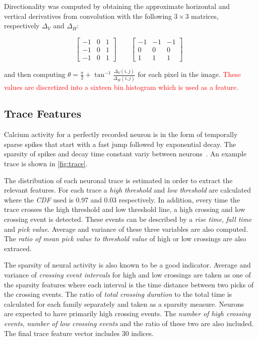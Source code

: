 \documentclass[10pt]{article}
\newcommand{\todo}[1]{\textcolor{red}{#1}}
\begin{document}
Directionality was computed by obtaining the approximate horizontal and vertical derivatives from convolution with the following $3\times3$ matrices, respectively $\Delta_V$ and $\Delta_H$:

$$
\begin{bmatrix}
-1 & 0 & 1 \\ -1 & 0 & 1 \\ -1 & 0 & 1
\end{bmatrix} \qquad
\begin{bmatrix}
-1 & -1 & -1 \\
0 & 0 & 0 \\
1 & 1 & 1
\end{bmatrix}
$$

\noindent
and then computing $\theta = \frac{\pi}{2} + \tan^{-1}\frac{\Delta_V(i,j)}{\Delta_H(i,j)}$ for each pixel in the image.
\todo{These values are discretized into a sixteen bin histogram which is used as a feature.}

\subsection{Trace Features}

Calcium activity for a perfectly recorded neuron is in the form of temporally sparse spikes that start with a fast jump followed by exponential decay. The sparsity of spikes and decay time constant variy between neurons~\cite{Mukamel2009}. 
An example trace is shown in \cref{fig:trace}.

The distribution of each neuronal trace is estimated in order to extract the relevant features. For each trace a \emph{high threshold} and \emph{low threshold} are calculated where the \emph{CDF} used is \num{0.97} and \num{0.03} respectively. In addition, every time the trace crosses the high threshold and low threshold line, a high crossing and low crossing event is detected. These events can be described by a \emph{rise time}, \emph{fall time} and \emph{pick value}. Average and variance of these three variables are also computed. The \emph{ratio of mean pick value to threshold value} of high or low crossings are also extraced.

The sparsity of neural activity is also known to be a good indicator. Average and variance of \emph{crossing event intervals} for high and low crossings are taken as one of the sparsity features where each interval is the time distance between two picks of the crossing events.  The ratio of \emph{total crossing duration} to the total time is calculated for each family separately and taken as a sparsity measure. Neurons are expected to have primarily high crossing events. The \emph{number of high crossing events}, \emph{number of low crossing events} and the ratio of these two are also included. The final trace feature vector includes \num{30} indices.
\end{document}
